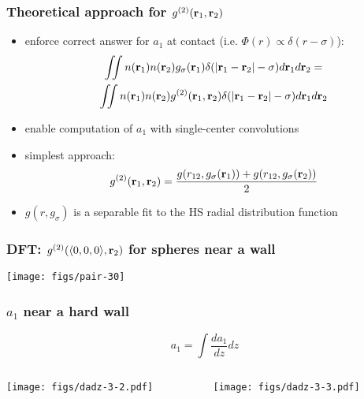 \begin{frame}
  \frametitle{Theoretical approach for $g^{(2)}(\mathbf{r}_1,\mathbf{r}_2)$}
  \begin{block}{}
    \begin{itemize}
    \item enforce correct answer for $a_1$ at contact (i.e. $\Phi(r)
      \propto \delta(r-\sigma)$):
      \begin{multline*}
        \iint n(\mathbf{r}_1) n(\mathbf{r}_2) g_\sigma(\mathbf{r}_1)
        \delta(|\mathbf{r}_1-\mathbf{r}_2|-\sigma)
        d\mathbf{r}_1 d\mathbf{r}_2
        =\\
        \iint n(\mathbf{r}_1) n(\mathbf{r}_2) g^{(2)}(\mathbf{r}_1, \mathbf{r}_2)
        \delta(|\mathbf{r}_1-\mathbf{r}_2|-\sigma)
        d\mathbf{r}_1 d\mathbf{r}_2
      \end{multline*}
    \item enable computation of $a_1$ with single-center convolutions
    \item simplest approach:
      \begin{equation*}
        g^{(2)}(\mathbf{r}_1,\mathbf{r}_2) = \frac{g(r_{12}, g_\sigma(\mathbf{r}_1)) +
          g(r_{12}, g_\sigma(\mathbf{r}_2))}{2}
      \end{equation*}
    \item $g(r,g_\sigma)$ is a separable fit to the HS radial
      distribution function
    \end{itemize}
  \end{block}
\end{frame}

\begin{frame}
  \frametitle{DFT: $g^{(2)}(\langle 0,0,0\rangle,\mathbf{r}_2)$ for spheres near a wall}
  \texttt{[image: figs/pair-30]}
\end{frame}

\begin{frame}
  \frametitle{$a_1$ near a hard wall}
  \[ a_1 = \int \frac{da_1}{dz} dz \]
  \vspace{-3em}
  \begin{columns}
    \begin{column}{0.5\columnwidth}
      \begin{center}
        \texttt{[image: figs/dadz-3-2.pdf]}
      \end{center}
    \end{column}
    \begin{column}{0.5\columnwidth}
      \begin{center}
        \texttt{[image: figs/dadz-3-3.pdf]}
      \end{center}
    \end{column}
  \end{columns}
\end{frame}

